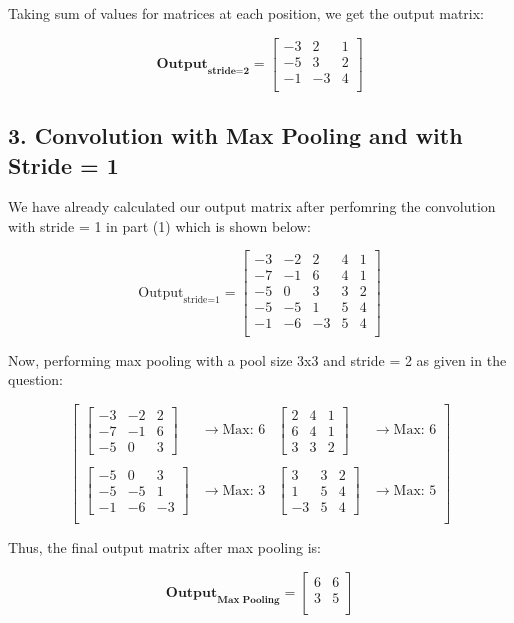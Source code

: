\documentclass{article}
\begin{document}
Taking sum of values for matrices at each position, we get the output matrix:

\[
  \textbf{Output}_{\textbf{stride=2}} =
  \begin{bmatrix}
    -3 & 2  & 1 \\
    -5 & 3  & 2 \\
    -1 & -3 & 4 \\
  \end{bmatrix}
\]


\subsection*{3. Convolution with Max Pooling and with Stride = 1}
We have already calculated our output matrix after perfomring the convolution with stride = 1 in part (1) which is shown below:

\[
  \text{Output}_{\text{stride=1}} =
  \begin{bmatrix}
    -3 & -2 & 2  & 4 & 1 \\
    -7 & -1 & 6  & 4 & 1 \\
    -5 & 0  & 3  & 3 & 2 \\
    -5 & -5 & 1  & 5 & 4 \\
    -1 & -6 & -3 & 5 & 4 \\
  \end{bmatrix}
\]

Now, performing max pooling with a pool size 3x3 and stride = 2 as given in the question:

\[
  \begin{bmatrix}
    \begin{bmatrix} -3 & -2 & 2 \\ -7 & -1 & 6 \\ -5 & 0 & 3 \end{bmatrix} & \rightarrow \text{Max: } 6 &
    \begin{bmatrix} 2 & 4 & 1 \\ 6 & 4 & 1 \\ 3 & 3 & 2 \end{bmatrix} & \rightarrow \text{Max: } 6   \\
    \\
    \begin{bmatrix} -5 & 0 & 3 \\ -5 & -5 & 1 \\ -1 & -6 & -3 \end{bmatrix} & \rightarrow \text{Max: } 3 &
    \begin{bmatrix} 3 & 3 & 2 \\ 1 & 5 & 4 \\ -3 & 5 & 4 \end{bmatrix} & \rightarrow \text{Max: } 5   \\
  \end{bmatrix}
\]

Thus, the final output matrix after max pooling is:

\[
  \textbf{Output}_{\textbf{Max Pooling}} =
  \begin{bmatrix}
    6 & 6 \\
    3 & 5 \\
  \end{bmatrix}
\]
\end{document}
